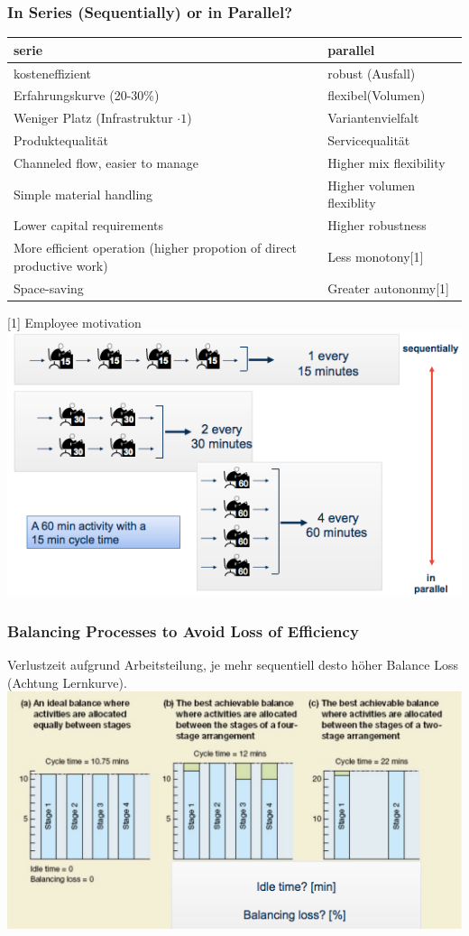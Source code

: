 \subsubsection{In Series (Sequentially) or in Parallel?}
\begin{tabular}{|>{\centering\arraybackslash}p{7cm}|>{\centering\arraybackslash}p{7cm}|}
	\hline serie & parallel \\ 
	\hline kosteneffizient & robust (Ausfall) \\ 
	Erfahrungskurve (20-30\%) & flexibel(Volumen)\\
	 Weniger Platz (Infrastruktur $\cdot1$)& Variantenvielfalt
	 \\ Produktequalit\"at &   Servicequalit\"at\\ 
	\hline 
	Channeled flow, easier to manage & Higher mix flexibility \\
	Simple material handling & Higher volumen flexiblity \\
	Lower capital requirements & Higher robustness\\
	More efficient operation (higher propotion of direct productive work) & Less monotony[1]
\\
Space-saving & Greater autononmy[1] \\
	\hline
\end{tabular} 
[1] Employee motivation\\
\includegraphics[width=1\textwidth]{W04/sqvspar}

\subsubsection{Balancing Processes to Avoid Loss of Efficiency}
Verlustzeit aufgrund Arbeitsteilung, je mehr sequentiell desto h\"oher Balance Loss (Achtung Lernkurve).\\
\includegraphics[width=1\textwidth]{W04/balancingprocess}